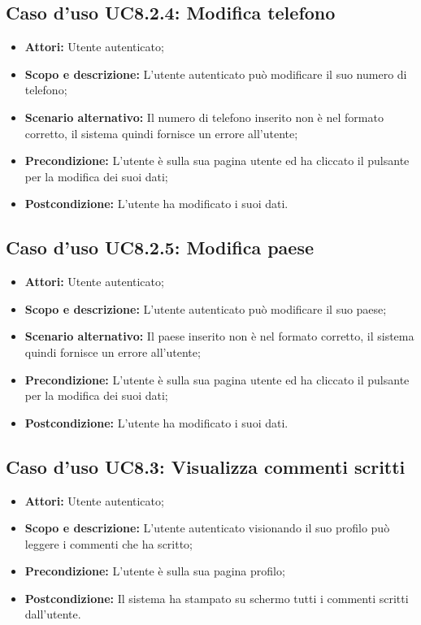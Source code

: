 \documentclass[12pt,a4paper,titlepage]{article}
\begin{document}
\subsection{Caso d'uso UC8.2.4: Modifica telefono}
\begin{itemize}
	\item \textbf{Attori: }Utente autenticato;
	\item \textbf{Scopo e descrizione: }L'utente autenticato può modificare il suo numero di telefono;
	\item \textbf{Scenario alternativo: }Il numero di telefono inserito non è nel formato corretto, il sistema quindi fornisce un errore all'utente;
	\item \textbf{Precondizione: }L'utente è sulla sua pagina utente ed ha cliccato il pulsante per la modifica dei suoi dati;
	\item \textbf{Postcondizione: }L'utente ha modificato i suoi dati.
\end{itemize}
\subsection{Caso d'uso UC8.2.5: Modifica paese}
\begin{itemize}
	\item \textbf{Attori: }Utente autenticato;
	\item \textbf{Scopo e descrizione: }L'utente autenticato può modificare il suo paese;
	\item \textbf{Scenario alternativo: }Il paese inserito non è nel formato corretto, il sistema quindi fornisce un errore all'utente;
	\item \textbf{Precondizione: }L'utente è sulla sua pagina utente ed ha cliccato il pulsante per la modifica dei suoi dati;
	\item \textbf{Postcondizione: }L'utente ha modificato i suoi dati.
\end{itemize}
\subsection{Caso d'uso UC8.3: Visualizza commenti scritti}
\begin{itemize}
	\item \textbf{Attori: }Utente autenticato;
	\item \textbf{Scopo e descrizione: }L'utente autenticato visionando il suo profilo può leggere i commenti che ha scritto;
	\item \textbf{Precondizione: }L'utente è sulla sua pagina profilo;
	\item \textbf{Postcondizione: }Il sistema ha stampato su schermo tutti i commenti scritti dall'utente.
\end{itemize}
\end{document}
